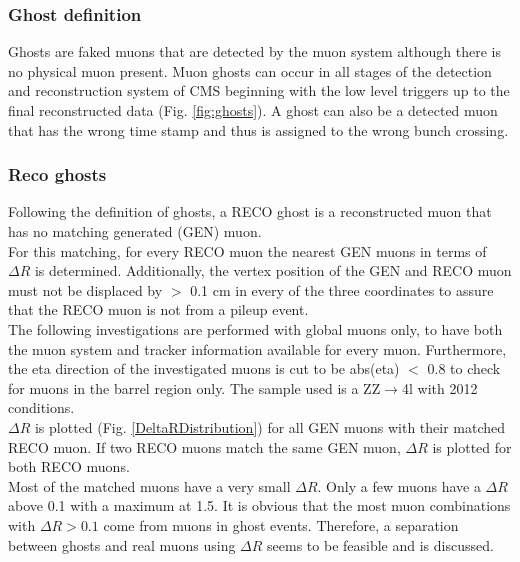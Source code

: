 \subsubsection{Ghost definition}
Ghosts are faked muons that are detected by the muon system although there is no physical muon present.
Muon ghosts can occur in all stages of the detection and reconstruction system of CMS beginning with the low level triggers up to the final reconstructed data (Fig. \ref{fig:ghosts}).
A ghost can also be a detected muon that has the wrong time stamp and thus is assigned to the wrong bunch crossing.

\subsubsection{Reco ghosts}
Following the definition of ghosts, a RECO ghost is a reconstructed muon that has no matching generated (GEN) muon.\\
For this matching, for every RECO muon the nearest GEN muons in terms of $\Delta R$ is determined. Additionally, the vertex position of the GEN and RECO muon must not be displaced by $>$ 0.1 cm in every of the three coordinates to assure that the RECO muon is not from a pileup event.\\
The following investigations are performed with global muons only, to have both the muon system and tracker information available for every muon. Furthermore, the eta direction of the investigated muons is cut to be abs(eta) $<$ 0.8 to check for muons in the barrel region only. The sample used is a ZZ$\to$4l with 2012 conditions.\\
$\Delta R$ is plotted (Fig. \ref{DeltaRDistribution}) for all GEN muons with their matched RECO muon. If two RECO muons match the same GEN muon, $\Delta R$ is plotted for both RECO muons.\\
Most of the matched muons have a very small $\Delta R$. Only a few muons have a $\Delta R$ above 0.1 with a maximum at 1.5. It is obvious that the most muon combinations with $\Delta R > 0.1$ come from muons in ghost events. Therefore, a separation between ghosts and real muons using $\Delta R$ seems to be feasible and is discussed.
